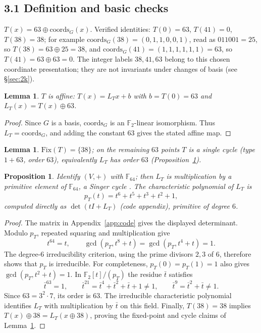 \documentclass[11pt]{article}
\newtheorem{lemma}[theorem]{Lemma}
\newtheorem{proposition}[theorem]{Proposition}
\begin{document}
\subsection*{3.1 Definition and basic checks}
$T(x)=63\oplus \mathrm{coords}_G(x)$. Verified identities:
$T(0)=63$, $T(41)=0$, $T(38)=38$; for example
$\mathrm{coords}_G(38)=(0,1,1,0,0,1)$, read as $011001=25$, so $T(38)=63\oplus25=38$,
and $\mathrm{coords}_G(41)=(1,1,1,1,1,1)=63$, so $T(41)=63\oplus63=0$.
The integer labels $38,41,63$ belong to this chosen coordinate presentation;
they are not invariants under changes of basis (see \S\ref{sec:2k}).
\begin{lemma}\label{lem:aff}
$T$ is affine: $T(x)=L_Tx+b$ with $b=T(0)=63$ and $L_T(x)=T(x)\oplus 63$.
\end{lemma}
\begin{proof}
Since $G$ is a basis, $\mathrm{coords}_G$ is an $\mathbb F_2$-linear
isomorphism. Thus $L_T=\mathrm{coords}_G$, and adding the constant $63$
gives the stated affine map.
\end{proof}
\begin{lemma}\label{lem:fix}
$\mathrm{Fix}(T)=\{38\}$; on the remaining $63$ points $T$ is a single cycle
(type $1+63$, order $63$), equivalently $L_T$ has order $63$ (Proposition~\ref{prop:singer}).
\end{lemma}
\begin{proposition}\label{prop:singer}
Identify $(V,+)$ with $\mathbb{F}_{64}$; then $L_T$ is
multiplication by a primitive element of $\mathbb{F}_{64}$, a Singer cycle \cite{LN}. The
characteristic polynomial of $L_T$ is
\begin{equation}\label{eq:pT}
p_T(t)=t^6+t^5+t^3+t^2+1,
\end{equation}
computed directly as $\det(tI+L_T)$ (code appendix), primitive of degree $6$.
\end{proposition}
\begin{proof}
The matrix in Appendix~\ref{app:code} gives the displayed determinant.
Modulo $p_T$, repeated squaring and multiplication give
\[
t^{64}=t,\qquad \gcd(p_T,t^8+t)=\gcd(p_T,t^4+t)=1.
\]
The degree-$6$ irreducibility criterion, using the prime divisors $2,3$ of
$6$, therefore shows that $p_T$ is irreducible. For completeness,
$p_T(0)=p_T(1)=1$ also gives $\gcd(p_T,t^2+t)=1$.
In $\mathbb F_2[t]/(p_T)$ the residue $\bar t$ satisfies
\[
\bar t^{63}=1,\qquad
\bar t^{21}=\bar t^4+\bar t^2+\bar t+1\ne1,\qquad
\bar t^9=\bar t^2+\bar t\ne1.
\]
Since $63=3^2\cdot7$, its order is $63$. The irreducible characteristic
polynomial identifies $L_T$ with multiplication by $\bar t$ on this field.
Finally, $T(38)=38$ implies $T(x)\oplus38=L_T(x\oplus38)$, proving
the fixed-point and cycle claims of Lemma~\ref{lem:fix}.
\end{proof}
\end{document}
